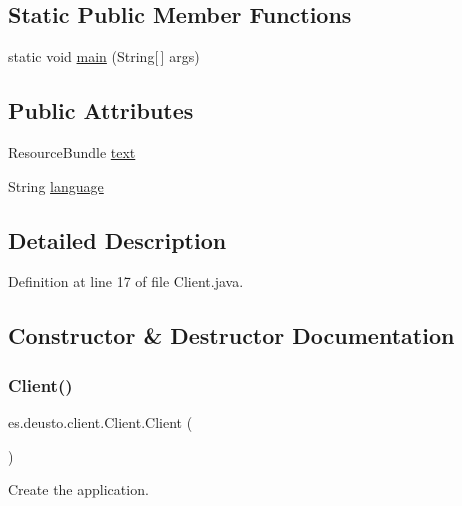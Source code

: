 \subsection*{Static Public Member Functions}
\begin{DoxyCompactItemize}
\item 
static void \mbox{\hyperlink{classes_1_1deusto_1_1client_1_1_client_a69a7526d0af9cb2341f4bf341b501152}{main}} (String\mbox{[}$\,$\mbox{]} args)
\end{DoxyCompactItemize}
\subsection*{Public Attributes}
\begin{DoxyCompactItemize}
\item 
Resource\+Bundle \mbox{\hyperlink{classes_1_1deusto_1_1client_1_1_client_ac0529c523794059756ce5185ac0a0d48}{text}}
\item 
String \mbox{\hyperlink{classes_1_1deusto_1_1client_1_1_client_a946c8733595a67fff10908135b56564b}{language}}
\end{DoxyCompactItemize}


\subsection{Detailed Description}


Definition at line 17 of file Client.\+java.



\subsection{Constructor \& Destructor Documentation}
\mbox{\label{classes_1_1deusto_1_1client_1_1_client_a71c03e318a72447da873297f3364f67f}} 
\subsubsection{\texorpdfstring{Client()}{Client()}}
{\footnotesize\ttfamily es.\+deusto.\+client.\+Client.\+Client (\begin{DoxyParamCaption}{ }\end{DoxyParamCaption})}

Create the application. 

